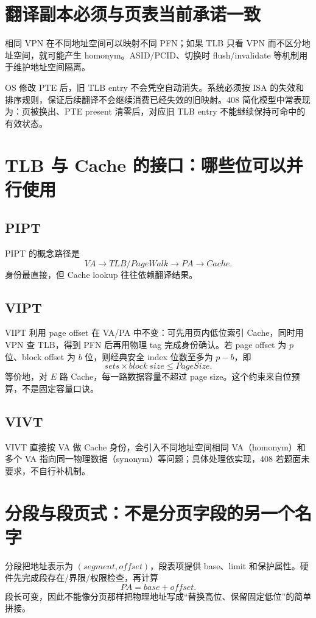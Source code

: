 \documentclass[UTF8,fontset=fandol,11pt,a4paper]{ctexart}
\begin{document}
\section{翻译副本必须与页表当前承诺一致}
相同 VPN 在不同地址空间可以映射不同 PFN；如果 TLB 只看 VPN 而不区分地址空间，就可能产生 homonym。ASID/PCID、切换时 flush/invalidate 等机制用于维护地址空间隔离。

OS 修改 PTE 后，旧 TLB entry 不会凭空自动消失。系统必须按 ISA 的失效和排序规则，保证后续翻译不会继续消费已经失效的旧映射。408 简化模型中常表现为：页被换出、PTE present 清零后，对应旧 TLB entry 不能继续保持可命中的有效状态。

\section{TLB 与 Cache 的接口：哪些位可以并行使用}
\subsection{PIPT}
PIPT 的概念路径是
\[
VA\to TLB/PageWalk\to PA\to Cache.
\]
身份最直接，但 Cache lookup 往往依赖翻译结果。

\subsection{VIPT}
VIPT 利用 page offset 在 VA/PA 中不变：可先用页内低位索引 Cache，同时用 VPN 查 TLB，得到 PFN 后再用物理 tag 完成身份确认。若 page offset 为 $p$ 位、block offset 为 $b$ 位，则经典安全 index 位数至多为 $p-b$，即
\[
sets\times block\ size\le PageSize.
\]
等价地，对 $E$ 路 Cache，每一路数据容量不超过 page size。这个约束来自位预算，不是固定容量口诀。

\subsection{VIVT}
VIVT 直接按 VA 做 Cache 身份，会引入不同地址空间相同 VA（homonym）和多个 VA 指向同一物理数据（synonym）等问题；具体处理依实现，408 若题面未要求，不自行补机制。

\section{分段与段页式：不是分页字段的另一个名字}
分段把地址表示为 $(segment,offset)$，段表项提供 base、limit 和保护属性。硬件先完成段存在/界限/权限检查，再计算
\[
PA=base+offset.
\]
段长可变，因此不能像分页那样把物理地址写成“替换高位、保留固定低位”的简单拼接。
\end{document}
